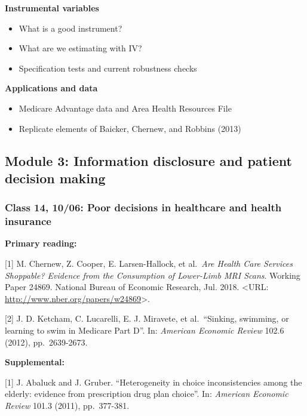 \documentclass[11pt,]{article}
\providecommand{\tightlist}{%
  \setlength{\itemsep}{0pt}\setlength{\parskip}{0pt}}
\begin{document}
\textbf{Instrumental variables}

\begin{itemize}
\tightlist
\item
  What is a good instrument?
\item
  What are we estimating with IV?
\item
  Specification tests and current robustness checks
\end{itemize}

\textbf{Applications and data}

\begin{itemize}
\tightlist
\item
  Medicare Advantage data and Area Health Resources File
\item
  Replicate elements of Baicker, Chernew, and Robbins (2013)
\end{itemize}

\hypertarget{module-3-information-disclosure-and-patient-decision-making}{%
\subsection{Module 3: Information disclosure and patient decision
making}\label{module-3-information-disclosure-and-patient-decision-making}}

\hypertarget{class-14-1006-poor-decisions-in-healthcare-and-health-insurance}{%
\subsubsection{Class 14, 10/06: Poor decisions in healthcare and health
insurance}\label{class-14-1006-poor-decisions-in-healthcare-and-health-insurance}}

\textbf{Primary reading:}

{[}1{]} M. Chernew, Z. Cooper, E. Larsen-Hallock, et al.~\emph{Are
Health Care Services Shoppable? Evidence from the Consumption of
Lower-Limb MRI Scans}. Working Paper 24869. National Bureau of Economic
Research, Jul. 2018. \textless URL:
\url{http://www.nber.org/papers/w24869}\textgreater.

{[}2{]} J. D. Ketcham, C. Lucarelli, E. J. Miravete, et al.~``Sinking,
swimming, or learning to swim in Medicare Part D''. In: \emph{American
Economic Review} 102.6 (2012), pp.~2639-2673.

\textbf{Supplemental:}

{[}1{]} J. Abaluck and J. Gruber. ``Heterogeneity in choice
inconsistencies among the elderly: evidence from prescription drug plan
choice''. In: \emph{American Economic Review} 101.3 (2011), pp.~377-381.
\end{document}
